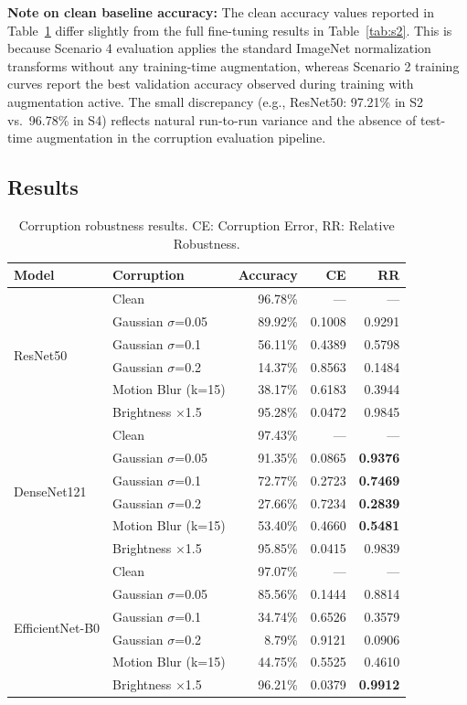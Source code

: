 \documentclass[11pt, a4paper]{article}
\begin{document}
\textbf{Note on clean baseline accuracy:} The clean accuracy values reported in Table~\ref{tab:s4} differ slightly from the full fine-tuning results in Table~\ref{tab:s2}. This is because Scenario 4 evaluation applies the standard ImageNet normalization transforms without any training-time augmentation, whereas Scenario 2 training curves report the best validation accuracy observed during training with augmentation active. The small discrepancy (e.g., ResNet50: 97.21\% in S2 vs.\ 96.78\% in S4) reflects natural run-to-run variance and the absence of test-time augmentation in the corruption evaluation pipeline.

\subsection{Results}

\begin{table}[H]
\centering
\caption{Corruption robustness results. CE: Corruption Error, RR: Relative Robustness.}
\label{tab:s4}
\begin{tabular}{llrrr}
\toprule
\textbf{Model} & \textbf{Corruption} & \textbf{Accuracy} & \textbf{CE} & \textbf{RR} \\
\midrule
\multirow{6}{*}{ResNet50} & Clean & 96.78\% & — & — \\
& Gaussian $\sigma$=0.05 & 89.92\% & 0.1008 & 0.9291 \\
& Gaussian $\sigma$=0.1 & 56.11\% & 0.4389 & 0.5798 \\
& Gaussian $\sigma$=0.2 & 14.37\% & 0.8563 & 0.1484 \\
& Motion Blur (k=15) & 38.17\% & 0.6183 & 0.3944 \\
& Brightness $\times$1.5 & 95.28\% & 0.0472 & 0.9845 \\
\midrule
\multirow{6}{*}{DenseNet121} & Clean & 97.43\% & — & — \\
& Gaussian $\sigma$=0.05 & 91.35\% & 0.0865 & \textbf{0.9376} \\
& Gaussian $\sigma$=0.1 & 72.77\% & 0.2723 & \textbf{0.7469} \\
& Gaussian $\sigma$=0.2 & 27.66\% & 0.7234 & \textbf{0.2839} \\
& Motion Blur (k=15) & 53.40\% & 0.4660 & \textbf{0.5481} \\
& Brightness $\times$1.5 & 95.85\% & 0.0415 & 0.9839 \\
\midrule
\multirow{6}{*}{EfficientNet-B0} & Clean & 97.07\% & — & — \\
& Gaussian $\sigma$=0.05 & 85.56\% & 0.1444 & 0.8814 \\
& Gaussian $\sigma$=0.1 & 34.74\% & 0.6526 & 0.3579 \\
& Gaussian $\sigma$=0.2 & 8.79\% & 0.9121 & 0.0906 \\
& Motion Blur (k=15) & 44.75\% & 0.5525 & 0.4610 \\
& Brightness $\times$1.5 & 96.21\% & 0.0379 & \textbf{0.9912} \\
\bottomrule
\end{tabular}
\end{table}
\end{document}
